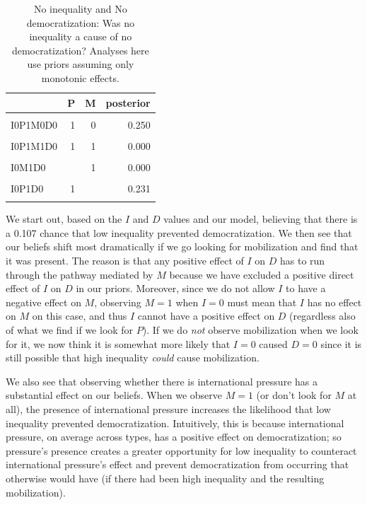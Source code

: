 \documentclass[
  12pt,
]{book}
\begin{document}
\begin{table}

\caption{\label{tab:Tapp1}No inequality and No democratization: Was no inequality a cause of no democratization? Analyses here use priors assuming only monotonic effects.}
\centering
\begin{tabular}[t]{lrrr}
\toprule
  & P & M & posterior\\
\midrule
\cellcolor{gray!6}{I0P0M0D0} & \cellcolor{gray!6}{0} & \cellcolor{gray!6}{0} & \cellcolor{gray!6}{0.107}\\
I0P1M0D0 & 1 & 0 & 0.250\\
\cellcolor{gray!6}{I0P0M1D0} & \cellcolor{gray!6}{0} & \cellcolor{gray!6}{1} & \cellcolor{gray!6}{0.000}\\
I0P1M1D0 & 1 & 1 & 0.000\\
\cellcolor{gray!6}{I0M0D0} & \cellcolor{gray!6}{} & \cellcolor{gray!6}{0} & \cellcolor{gray!6}{0.150}\\
\addlinespace
I0M1D0 &  & 1 & 0.000\\
\cellcolor{gray!6}{I0P0D0} & \cellcolor{gray!6}{0} & \cellcolor{gray!6}{} & \cellcolor{gray!6}{0.088}\\
I0P1D0 & 1 &  & 0.231\\
\cellcolor{gray!6}{I0D0} & \cellcolor{gray!6}{} & \cellcolor{gray!6}{} & \cellcolor{gray!6}{0.128}\\
\bottomrule
\end{tabular}
\end{table}

We start out, based on the \(I\) and \(D\) values and our model, believing that there is a 0.107 chance that low inequality prevented democratization. We then see that our beliefs shift most dramatically if we go looking for mobilization and find that it was present. The reason is that any positive effect of \(I\) on \(D\) has to run through the pathway mediated by \(M\) because we have excluded a positive direct effect of \(I\) on \(D\) in our priors. Moreover, since we do not allow \(I\) to have a negative effect on \(M\), observing \(M=1\) when \(I=0\) must mean that \(I\) has no effect on \(M\) on this case, and thus \(I\) cannot have a positive effect on \(D\) (regardless also of what we find if we look for \(P\)). If we do \emph{not} observe mobilization when we look for it, we now think it is somewhat more likely that \(I=0\) caused \(D=0\) since it is still possible that high inequality \emph{could} cause mobilization.

We also see that observing whether there is international pressure has a substantial effect on our beliefs. When we observe \(M=1\) (or don't look for \(M\) at all), the presence of international pressure increases the likelihood that low inequality prevented democratization. Intuitively, this is because international pressure, on average across types, has a positive effect on democratization; so pressure's presence creates a greater opportunity for low inequality to counteract international pressure's effect and prevent democratization from occurring that otherwise would have (if there had been high inequality and the resulting mobilization).
\end{document}
